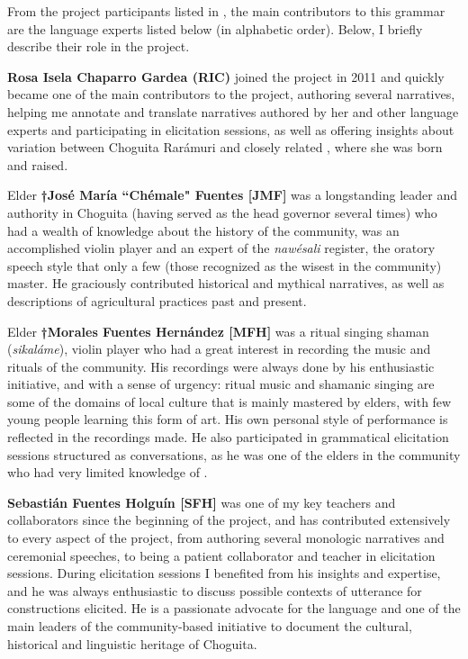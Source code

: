 From the project participants listed in , the main contributors to this grammar are the language experts listed below (in alphabetic order). Below, I briefly describe their role in the project.

\medskip

\noindent \textbf{Rosa Isela Chaparro Gardea (RIC)} joined the project in 2011 and quickly became one of the main contributors to the project, authoring several narratives, helping me annotate and translate narratives authored by her and other language experts and participating in elicitation sessions, as well as offering insights about variation between Choguita Rarámuri and closely related , where she was born and raised.

\medskip

\noindent Elder \textbf{†José María ``Chémale" Fuentes [JMF]} was a longstanding leader and authority in Choguita (having served as the head governor several times) who had a wealth of knowledge about the history of the community, was an accomplished violin player and an expert of the \textit{nawésali} register, the oratory speech style that only a few (those recognized as the wisest in the community) master. He graciously contributed historical and mythical narratives, as well as descriptions of agricultural practices past and present.

\medskip

\noindent Elder \textbf{†Morales Fuentes Hernández [MFH]} was a ritual singing shaman (\textit{sikaláme}), violin player who had a great interest in recording the music and rituals of the community. His recordings were always done by his enthusiastic initiative, and with a sense of urgency: ritual music and shamanic singing are some of the domains of local culture that is mainly mastered by elders, with few young people learning this form of art. His own personal style of performance is reflected in the recordings made. He also participated in grammatical elicitation sessions structured as conversations, as he was one of the elders in the community who had very limited knowledge of .

\medskip

\noindent \textbf{Sebastián Fuentes Holguín [SFH]} was one of my key teachers and collaborators since the beginning of the project, and has contributed extensively to every aspect of the project, from authoring several monologic narratives and ceremonial speeches, to being a patient collaborator and teacher in elicitation sessions. During elicitation sessions I benefited from his insights and expertise, and he was always enthusiastic to discuss possible contexts of utterance for constructions elicited. He is a passionate advocate for the language and one of the main leaders of the community-based initiative to document the cultural, historical and linguistic heritage of Choguita.

